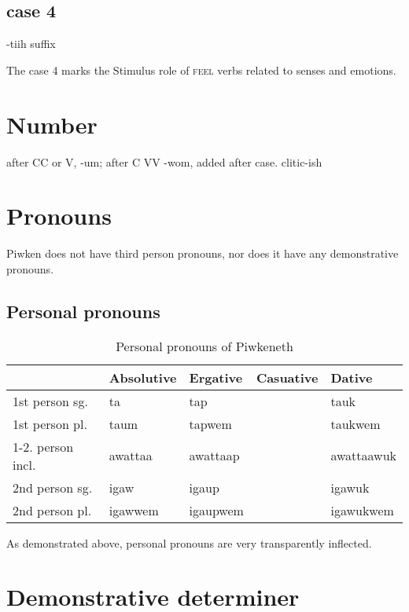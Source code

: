\documentclass[smallroyalvopaper,9pt]{memoir}
\newcommand{\lang}{Piwkeneth}
\newcommand{\langeng}{Piwken}
\begin{document}
\subsection{case 4}

-tiih suffix

The case 4 marks the Stimulus role of \textsc{feel} verbs related to senses and emotions.

\section{Number}

after CC or V, -um; after C VV -wom, added after case. clitic-ish

\section{Pronouns}

\langeng{} does not have third person pronouns, nor does it have any demonstrative pronouns. 

\subsection{Personal pronouns}

\begin{table}[ht]
    \centering
    \begin{tabular}{lllll}
        \toprule
                             & Absolutive & Ergative & Casuative & Dative \\
        \midrule
        1st person sg.       & ta         & tap      &   & tauk \\
        1st person pl.       & taum       & tapwem   &   & taukwem \\
        1-2. person incl.    & awattaa    & awattaap &   & awattaawuk \\
        2nd person sg.       & igaw       & igaup    &   & igawuk \\
        2nd person pl.       & igawwem    & igaupwem &   & igawukwem \\
        \bottomrule
    \end{tabular}
    \caption{Personal pronouns of \lang}
\end{table}

As demonstrated above, personal pronouns are very transparently inflected. 

\section{Demonstrative determiner}
\end{document}
